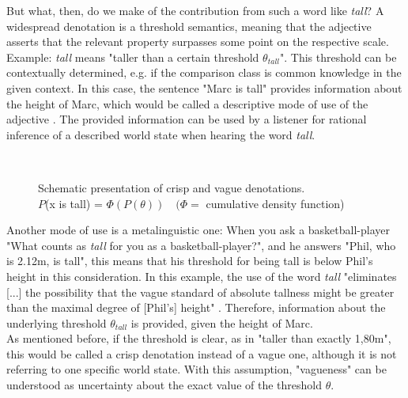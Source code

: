 But what, then, do we make of the contribution from such a word like \textit{tall}? A widespread denotation is a threshold semantics, meaning that the adjective asserts that the relevant property surpasses some point on the respective scale. Example: \textit{tall} means "taller than a certain threshold $\theta_{tall}$". This threshold can be contextually determined, e.g. if the comparison class is common knowledge in the given context. In this case, the sentence "Marc is tall" provides information about the height of Marc, which would be called a descriptive mode of use of the adjective \citep[by][]{barker2002dynamics}. The provided information can be used by a listener for rational inference of a described world state when hearing the word \textit{tall}.
\begin{figure}[!h]
 	\centering
 	\\
 \caption{Schematic presentation of crisp and vague denotations.\\
 $P$(x is tall) = $\Phi(P(\theta)) \quad (\Phi =$ cumulative density function)}
 \label{figure:meaning}
\end{figure}
Another mode of use is a metalinguistic one: 
When you ask a basketball-player "What counts as \textit{tall} for you as a basketball-player?", and he answers "Phil, who is 2.12m, is tall", this means that his threshold for being tall is below Phil's height in this consideration. 
In this example, the use of the word \textit{tall} "eliminates [...] the possibility that the vague standard of absolute tallness might be greater than the maximal degree of [Phil's] height" \citep{barker2002dynamics}. Therefore, information about the underlying threshold $\theta_{tall}$ is provided, given the height of Marc.\\

As mentioned before, if the threshold is clear, as in "taller than exactly 1,80m", this would be called a crisp denotation instead of a vague one, although it is not referring to one specific world state. With this assumption, "vagueness" can be understood as uncertainty about the exact value of the threshold $\theta$.\\

